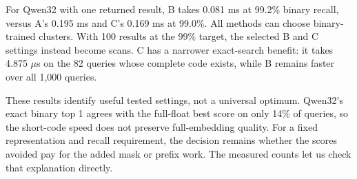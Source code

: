 For Qwen32 with one returned result, B takes 0.081 ms at 99.2\% binary recall, versus A's 0.195 ms and C's 0.169 ms at 99.0\%. All methods can choose binary-trained clusters. With 100 results at the 99\% target, the selected B and C settings instead become scans. C has a narrower exact-search benefit: it takes 4.875 $\mu$s on the 82 queries whose complete code exists, while B remains faster over all 1,000 queries.

These results identify useful tested settings, not a universal optimum. Qwen32's exact binary top 1 agrees with the full-float best score on only 14\% of queries, so the short-code speed does not preserve full-embedding quality. For a fixed representation and recall requirement, the decision remains whether the scores avoided pay for the added mask or prefix work. The measured counts let us check that explanation directly.
